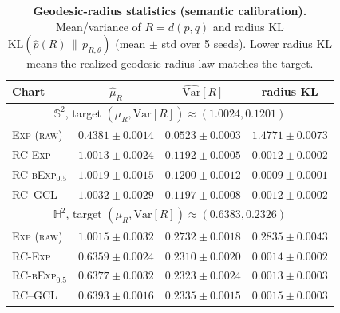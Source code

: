 \documentclass{article}
\theoremstyle{definition}
\theoremstyle{remark}
\newcommand{\SSS}{\mathbb{S}}
\newcommand{\HH}{\mathbb{H}}
\newcommand{\Exp}{\operatorname{Exp}}
\begin{document}



\begin{table}[t]
  \centering
  \caption{\textbf{Geodesic-radius statistics (semantic calibration).}
  Mean/variance of $R=d(p,q)$ and radius KL
  $\mathrm{KL}(\widehat p(R)\,\|\,p_{R,\theta})$ (mean $\pm$ std over 5 seeds).
  Lower radius KL means the realized geodesic-radius law matches the target.}
  \label{tab:synth_radius_stats}
  \small
  \setlength{\tabcolsep}{5pt}
  \begin{tabular}{lccc}
    \toprule
    Chart & $\hat\mu_R$ & $\widehat{\mathrm{Var}}[R]$ & radius KL \\
    \midrule
    \multicolumn{4}{c}{$\SSS^2$, target $(\mu_R,\mathrm{Var}[R])\approx(1.0024,0.1201)$} \\
    \midrule
     \textsc{Exp (raw)}              & $0.4381 \pm 0.0014$ & $0.0523 \pm 0.0003$ & $1.4771 \pm 0.0073$ \\
     \textsc{RC-Exp}                & $1.0013 \pm 0.0024$ & $0.1192 \pm 0.0005$ & $0.0012 \pm 0.0002$ \\
     \textsc{RC-bExp}$_{0.5}$       & $1.0019 \pm 0.0015$ & $0.1200 \pm 0.0012$ & $0.0009 \pm 0.0001$ \\
     \textsc{RC--GCL}                & $1.0032 \pm 0.0029$ & $0.1197 \pm 0.0008$ & $0.0012 \pm 0.0002$ \\
    \midrule
    \multicolumn{4}{c}{$\HH^2$, target $(\mu_R,\mathrm{Var}[R])\approx(0.6383,0.2326)$} \\
    \midrule
     \textsc{Exp (raw)}              & $1.0015 \pm 0.0032$ & $0.2732 \pm 0.0018$ & $0.2835 \pm 0.0043$ \\
     \textsc{RC-Exp}                & $0.6359 \pm 0.0024$ & $0.2310 \pm 0.0020$ & $0.0014 \pm 0.0002$ \\
     \textsc{RC-bExp}$_{0.5}$       & $0.6377 \pm 0.0032$ & $0.2323 \pm 0.0024$ & $0.0013 \pm 0.0003$ \\
     \textsc{RC--GCL}                & $0.6393 \pm 0.0016$ & $0.2335 \pm 0.0015$ & $0.0015 \pm 0.0003$ \\
    \bottomrule
  \end{tabular}
\end{table}
\end{document}
